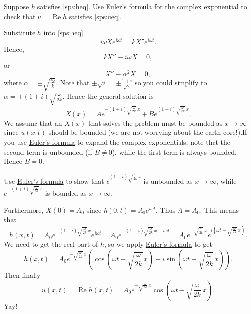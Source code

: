 \documentclass{ximera}
\begin{document}
\begin{exercise}
    Suppose $h$ satisfies \eqref{sps:heq}. Use \hyperref[eulersformula]{Euler's formula} for the complex exponential to check that $u = \operatorname{Re} h$ satisfies \eqref{sps:ueq}.
\end{exercise}

Substitute $h$ into \eqref{sps:heq}.
\begin{equation*}
    i\omega X e^{i\omega t} = k X'' e^{i \omega t} .
\end{equation*}
Hence,
\begin{equation*}
    k X''  - i \omega X = 0 ,
\end{equation*}
or 
\begin{equation*}
    X''  - \alpha^2 X = 0 ,
\end{equation*}
where $\alpha = \pm \sqrt{\frac{i\omega}{k}}$.  Note that $\pm \sqrt{i} = \pm \frac{1+i}{\sqrt{2}}$ so you could simplify to $\alpha = \pm (1+i)\sqrt{\frac{\omega}{2k}}$. Hence the general solution is
\begin{equation*}
    X(x) = A e^{-(1+i)\sqrt{\frac{\omega}{2k}} \, x} + B e^{(1+i)\sqrt{\frac{\omega}{2k}} \, x} .
\end{equation*}
We assume that an $X(x)$ that solves the problem must be bounded as $x \to \infty$ since $u(x,t)$ should be bounded (we are not worrying about the earth core!).If you use \hyperref[eulersformula]{Euler's formula} to expand the complex exponentials, note that the second term is unbounded (if $B \not = 0$), while the first term is always bounded.  Hence $B=0$.

\begin{exercise}
    Use \hyperref[eulersformula]{Euler's formula} to show that $e^{(1+i)\sqrt{\frac{\omega}{2k}} \, x}$ is unbounded as $x \to \infty$, while $e^{-(1+i)\sqrt{\frac{\omega}{2k}} \, x}$ is bounded as $x \to \infty$.
\end{exercise}

Furthermore, $X(0) = A_0$ since $h(0,t) = A_0 e^{i \omega t}$. Thus $A=A_0$.  This means that
\begin{equation*}
    h(x,t) = A_0 e^{-(1+i)\sqrt{\frac{\omega}{2k}} \, x} e^{i \omega t} = A_0 e^{-(1+i)\sqrt{\frac{\omega}{2k}} \, x + i \omega t}
    = A_0 e^{-\sqrt{\frac{\omega}{2k}} \, x} e^{i(\omega t - \sqrt{\frac{\omega}{2k}} \, x)} .
\end{equation*}
We need to get the real part of $h$, so we apply \hyperref[eulersformula]{Euler's formula} to get
\begin{equation*}
    h(x,t) = A_0 e^{-\sqrt{\frac{\omega}{2k}} \, x} \left(\cos \left(\omega t - \sqrt{\frac{\omega}{2k}}\, x\right) + 
    i \sin \left(\omega t - \sqrt{\frac{\omega}{2k}}\, x\right) \right) .
\end{equation*}
Then finally
\begin{equation*}
    u(x,t) = \operatorname{Re} h(x,t) = A_0 e^{-\sqrt{\frac{\omega}{2k}}\, x} \cos \left(\omega t - \sqrt{\frac{\omega}{2k}}\, x\right) .
\end{equation*}
Yay!
\end{document}
